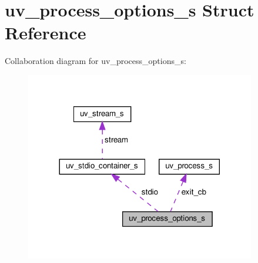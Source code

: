 \hypertarget{structuv__process__options__s}{}\section{uv\+\_\+process\+\_\+options\+\_\+s Struct Reference}
\label{structuv__process__options__s}


Collaboration diagram for uv\+\_\+process\+\_\+options\+\_\+s\+:
\nopagebreak
\begin{figure}[H]
\begin{center}
\leavevmode
\includegraphics[width=284pt]{structuv__process__options__s__coll__graph}
\end{center}
\end{figure}
